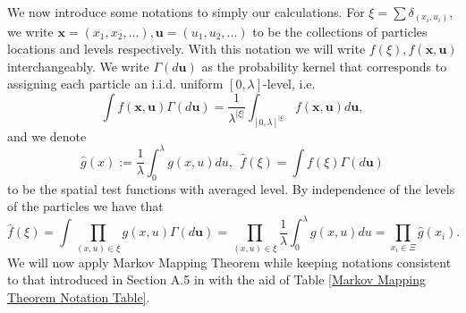 \documentclass[12pt]{article}
\def \hat{\widehat}
\begin{document}
We now introduce some notations to simply our calculations. For $\xi=\sum \delta_{(x_i,u_i)}$, we write $\textbf{x}=(x_1,x_2,...), \textbf{u}=(u_1,u_2,...)$ to be the collections of particles locations and levels respectively. With this notation we will write $f(\xi), f(\textbf{x},\textbf{u})$ interchangeably. We write $\Gamma (d\textbf{u})$ as the probability kernel that corresponds to assigning each particle an i.i.d. uniform $[0,\lambda]$-level, i.e.
$$\int f(\textbf{x},\textbf{u})\Gamma (d\textbf{u})=\frac{1}{\lambda^{|\xi|}}\int_{[0,\lambda]^{|\xi|}}f(\textbf{x},\textbf{u})d\textbf{u},$$
and we denote
$$\hat{g}(x):=\frac{1}{\lambda}\int_{0}^{\lambda}g(x,u)du, ~~\hat{f}(\xi)=\int f(\xi) \Gamma (d\textbf{u})$$ 
to be the spatial test functions with averaged level. By independence of the levels of the particles we have that
$$\hat{f}(\xi)=\int \prod_{(x,u) \in \xi}g(x,u) \Gamma(d\textbf{u})=\prod_{(x,u)\in \xi}\frac{1}{\lambda}\int_{0}^{\lambda} g(x,u) du=\prod_{x_i \in \Xi}\hat{g}(x_i).$$ 
We will now apply Markov Mapping Theorem while keeping notations consistent to that introduced in Section A.5 in \cite{kurtz/rodrigues:2011} with the aid of Table \ref{Markov Mapping Theorem Notation Table}.
\end{document}
